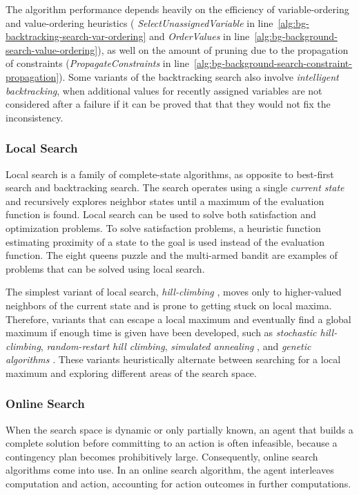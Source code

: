 The algorithm performance depends heavily on the efficiency of
variable-ordering and value-ordering heuristics ({\em
  SelectUnassignedVariable} in
line~\ref{alg:bg-backtracking-search-var-ordering}
and {\em  OrderValues} in
line~\ref{alg:bg-background-search-value-ordering}), as well on the
amount of pruning due to the propagation of constraints
({\em PropagateConstraints} in line~\ref{alg:bg-background-search-constraint-propagation}). Some
variants of the backtracking search also involve {\em intelligent
  backtracking}, when additional values for recently assigned
variables are not considered after a failure if it can be proved
that that they would not fix the inconsistency.


\subsubsection{Local Search}

Local search is a family of complete-state algorithms, as opposite to
best-first search and backtracking search. The search operates using a
single {\em current state} and recursively explores neighbor states
until a maximum of the evaluation function is found. Local search can
be used to solve both satisfaction and optimization problems. To solve
satisfaction problems, a heuristic function estimating proximity of a
state to the goal is used instead of the evaluation function. The
eight queens puzzle and the multi-armed bandit are examples of
problems that can be solved using local search.

The simplest variant of local search, {\em hill-climbing}
\cite{Russell.aima}, moves only to higher-valued neighbors of the
current state and is prone to getting stuck on local maxima. Therefore,
variants that can escape a local maximum and eventually find a global
maximum if enough time is given have been developed, such as {\em
stochastic hill-climbing}, {\em random-restart hill climbing}, {\em
simulated annealing} \cite{Russell.aima}, and {\em genetic algorithms}
\cite{Eiben.evolcomp}. These variants heuristically alternate between
searching for a local maximum and exploring different areas of the
search space.

\subsubsection{Online Search}

When the search space is dynamic or only partially known, an agent
that builds a complete solution before committing to an action is
often infeasible, because a contingency plan becomes prohibitively
large. Consequently, online search algorithms come into use. In an
online search algorithm, the agent interleaves computation and action,
accounting for action outcomes in further computations.

